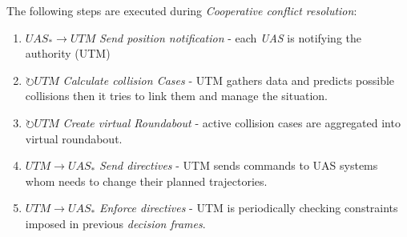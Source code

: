 \noindent The following steps are executed during \emph{Cooperative conflict resolution}:
\begin{enumerate}
    \item $UAS_* \to UTM$ \emph{Send position notification} - each \emph{UAS} is notifying the authority (UTM)
    
    \item $\circlearrowright UTM$ \emph{Calculate collision Cases} - UTM gathers data and predicts possible collisions then it tries to link them and manage the situation.
    
    \item $\circlearrowright UTM$ \emph{Create virtual Roundabout} - active collision cases are aggregated into virtual roundabout. 
    
    \item $UTM \to UAS_*$ \emph{Send directives} - UTM sends commands to UAS systems whom needs to change their planned trajectories. 
    
    \item $UTM \to UAS_*$ \emph{Enforce directives} - UTM is periodically checking constraints imposed in previous \emph{decision frames}.
\end{enumerate}